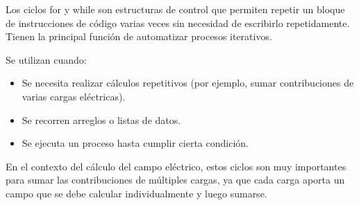 \tab Los ciclos for y while son estructuras de control que permiten repetir un bloque de instrucciones de código varias veces sin necesidad de escribirlo repetidamente. Tienen la principal función de automatizar procesos iterativos.

Se utilizan cuando:
\begin{itemize}
    \item Se necesita realizar cálculos repetitivos (por ejemplo, sumar contribuciones de varias cargas eléctricas).
    \item Se recorren arreglos o listas de datos.
    \item Se ejecuta un proceso hasta cumplir cierta condición.
\end{itemize}

En el contexto del cálculo del campo eléctrico, estos ciclos son muy importantes para sumar las contribuciones de múltiples cargas, ya que cada carga aporta un campo que se debe calcular individualmente y luego sumarse.